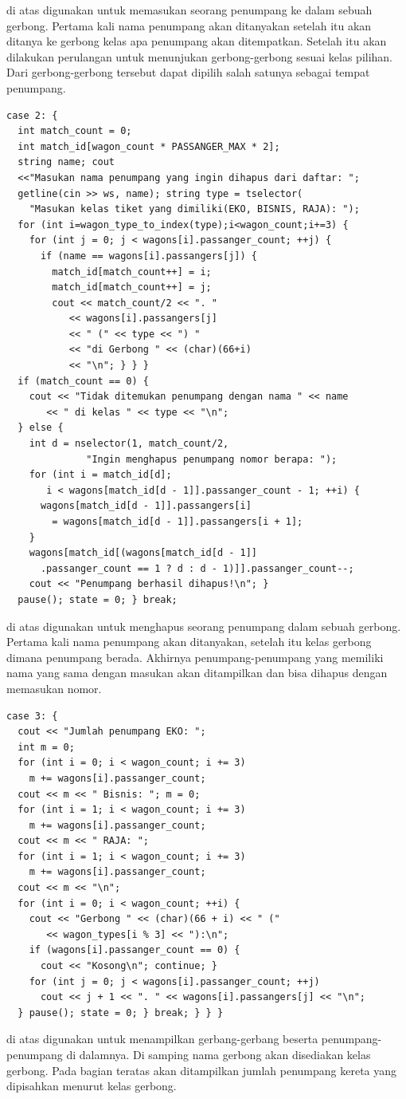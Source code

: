 \documentclass[../main.tex]{subfiles}
\begin{document}
{\Script} di atas digunakan untuk memasukan seorang penumpang ke dalam sebuah gerbong. Pertama kali nama penumpang akan ditanyakan setelah itu akan ditanya ke gerbong kelas apa penumpang akan ditempatkan. Setelah itu akan dilakukan perulangan untuk menunjukan gerbong-gerbong sesuai kelas pilihan. Dari gerbong-gerbong tersebut dapat dipilih salah satunya sebagai tempat penumpang.

\begin{code}
\begin{verbatim}
case 2: {
  int match_count = 0;
  int match_id[wagon_count * PASSANGER_MAX * 2];
  string name; cout
  <<"Masukan nama penumpang yang ingin dihapus dari daftar: ";
  getline(cin >> ws, name); string type = tselector(
    "Masukan kelas tiket yang dimiliki(EKO, BISNIS, RAJA): ");
  for (int i=wagon_type_to_index(type);i<wagon_count;i+=3) {
    for (int j = 0; j < wagons[i].passanger_count; ++j) {
      if (name == wagons[i].passangers[j]) {
        match_id[match_count++] = i;
        match_id[match_count++] = j;
        cout << match_count/2 << ". "
           << wagons[i].passangers[j]
           << " (" << type << ") "
           << "di Gerbong " << (char)(66+i)
           << "\n"; } } }
  if (match_count == 0) {
    cout << "Tidak ditemukan penumpang dengan nama " << name
       << " di kelas " << type << "\n";
  } else {
    int d = nselector(1, match_count/2,
              "Ingin menghapus penumpang nomor berapa: ");
    for (int i = match_id[d];
       i < wagons[match_id[d - 1]].passanger_count - 1; ++i) {
      wagons[match_id[d - 1]].passangers[i]
        = wagons[match_id[d - 1]].passangers[i + 1];
    }
    wagons[match_id[(wagons[match_id[d - 1]]
      .passanger_count == 1 ? d : d - 1)]].passanger_count--;
    cout << "Penumpang berhasil dihapus!\n"; }
  pause(); state = 0; } break;
\end{verbatim}
\end{code}

{\Script} di atas digunakan untuk menghapus seorang penumpang dalam sebuah gerbong. Pertama kali nama penumpang akan ditanyakan, setelah itu kelas gerbong dimana penumpang berada. Akhirnya penumpang-penumpang yang memiliki nama yang sama dengan masukan akan ditampilkan dan bisa dihapus dengan memasukan nomor.

\begin{code}
\begin{verbatim}
case 3: {
  cout << "Jumlah penumpang EKO: ";
  int m = 0;
  for (int i = 0; i < wagon_count; i += 3)
    m += wagons[i].passanger_count;
  cout << m << " Bisnis: "; m = 0;
  for (int i = 1; i < wagon_count; i += 3)
    m += wagons[i].passanger_count;
  cout << m << " RAJA: ";
  for (int i = 1; i < wagon_count; i += 3)
    m += wagons[i].passanger_count;
  cout << m << "\n";
  for (int i = 0; i < wagon_count; ++i) {
    cout << "Gerbong " << (char)(66 + i) << " ("
       << wagon_types[i % 3] << "):\n";
    if (wagons[i].passanger_count == 0) {
      cout << "Kosong\n"; continue; }
    for (int j = 0; j < wagons[i].passanger_count; ++j)
      cout << j + 1 << ". " << wagons[i].passangers[j] << "\n";
  } pause(); state = 0; } break; } } }
\end{verbatim}
\end{code}

{\Script} di atas digunakan untuk menampilkan gerbang-gerbang beserta penumpang-penumpang di dalamnya. Di samping nama gerbong akan disediakan kelas gerbong. Pada bagian teratas akan ditampilkan jumlah penumpang kereta yang dipisahkan menurut kelas gerbong.
\end{document}
